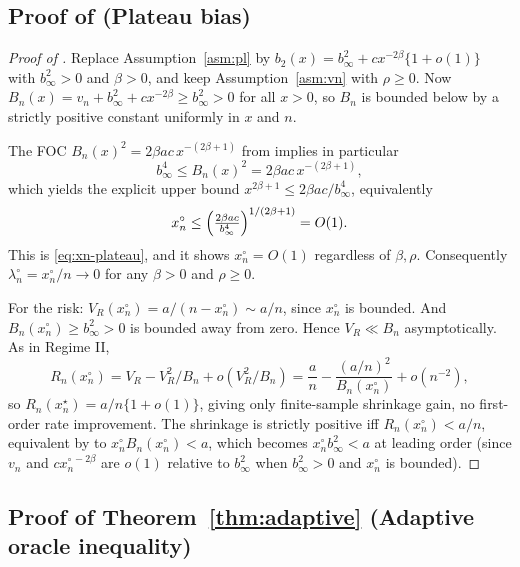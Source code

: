 \subsection{Proof of \texorpdfstring{}{Proposition~\ref{prop:plateau}} (Plateau bias)}\label{proof:plateau}

\begin{proof}[Proof of ]
Replace Assumption~\ref{asm:pl} by $b_2(x) = b_\infty^2 + c x^{-2\beta}\{1+o(1)\}$ with $b_\infty^2 > 0$ and $\beta > 0$, and keep Assumption~\ref{asm:vn} with $\rho \ge 0$. Now $B_n(x) = v_n + b_\infty^2 + c x^{-2\beta} \ge b_\infty^2 > 0$ for all $x > 0$, so $B_n$ is bounded below by a strictly positive constant uniformly in $x$ and $n$.

The FOC $B_n(x)^2 = 2\beta a c\, x^{-(2\beta+1)}$ from  implies in particular
\[
b_\infty^4 \le B_n(x)^2 = 2\beta a c\, x^{-(2\beta+1)},
\]
which yields the explicit upper bound $x^{2\beta+1} \le 2\beta a c / b_\infty^4$, equivalently
\[
x_n^\circ \le \Bigl(\tfrac{2\beta a c}{b_\infty^4}\Bigr)^{1/(2\beta+1)} = O(1).
\]
This is \cref{eq:xn-plateau}, and it shows $x_n^\circ = O(1)$ regardless of $\beta, \rho$. Consequently $\lambda_n^\circ = x_n^\circ / n \to 0$ for any $\beta > 0$ and $\rho \ge 0$.

For the risk: $V_R(x_n^\circ) = a/(n - x_n^\circ) \sim a/n$, since $x_n^\circ$ is bounded. And $B_n(x_n^\circ) \ge b_\infty^2 > 0$ is bounded away from zero. Hence $V_R \ll B_n$ asymptotically. As in Regime II,
\[
R_n(x_n^\circ) = V_R - V_R^2 / B_n + o(V_R^2 / B_n)
              = \frac{a}{n} - \frac{(a/n)^2}{B_n(x_n^\circ)} + o(n^{-2}),
\]
so $R_n(x_n^\star) = a/n\{1+o(1)\}$, giving only finite-sample shrinkage gain, no first-order rate improvement. The shrinkage is strictly positive iff $R_n(x_n^\circ) < a/n$, equivalent by  to $x_n^\circ B_n(x_n^\circ) < a$, which becomes $x_n^\circ b_\infty^2 < a$ at leading order (since $v_n$ and $c x_n^{\circ\, -2\beta}$ are $o(1)$ relative to $b_\infty^2$ when $b_\infty^2 > 0$ and $x_n^\circ$ is bounded).
\end{proof}

\subsection{Proof of \texorpdfstring{Theorem~\ref{thm:adaptive}}{Theorem~\ref{thm:adaptive}} (Adaptive oracle inequality)}\label{proof:adaptive}

